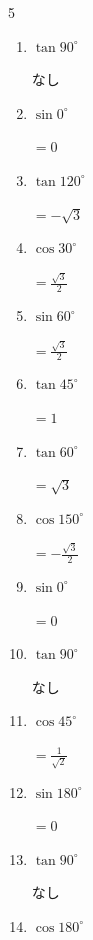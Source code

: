 \begin{multicols}{5}
\begin{enumerate}
\resetques

  \item $\displaystyle \tan{90^\circ}$

        $\displaystyle なし$

  \item $\displaystyle \sin{0^\circ}$

        $\displaystyle =0$

  \item $\displaystyle \tan{120^\circ}$

        $\displaystyle =-\sqrt{3}$

  \item $\displaystyle \cos{30^\circ}$

        $\displaystyle =\frac{\sqrt{3}}{2}$

  \item $\displaystyle \sin{60^\circ}$

        $\displaystyle =\frac{\sqrt{3}}{2}$

  \item $\displaystyle \tan{45^\circ}$

        $\displaystyle =1$

  \item $\displaystyle \tan{60^\circ}$

        $\displaystyle =\sqrt{3}$

  \item $\displaystyle \cos{150^\circ}$

        $\displaystyle =-\frac{\sqrt{3}}{2}$

  \item $\displaystyle \sin{0^\circ}$

        $\displaystyle =0$

  \item $\displaystyle \tan{90^\circ}$

        $\displaystyle なし$

  \item $\displaystyle \cos{45^\circ}$

        $\displaystyle =\frac{1}{\sqrt{2}}$

  \item $\displaystyle \sin{180^\circ}$

        $\displaystyle =0$

  \item $\displaystyle \tan{90^\circ}$

        $\displaystyle なし$

  \item $\displaystyle \cos{180^\circ}$


\end{enumerate}
\end{multicols}
